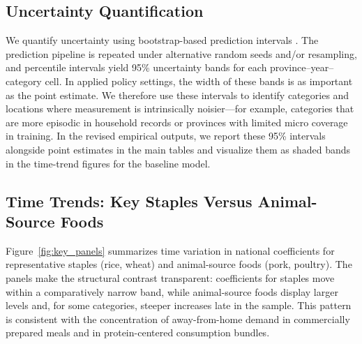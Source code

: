 \documentclass[12pt,a4paper]{article}
\begin{document}
\subsection{Uncertainty Quantification}

We quantify uncertainty using bootstrap-based prediction intervals \citep{Efron1993}. The prediction pipeline is repeated under alternative random seeds and/or resampling, and percentile intervals yield 95\% uncertainty bands for each province--year--category cell. In applied policy settings, the width of these bands is as important as the point estimate. We therefore use these intervals to identify categories and locations where measurement is intrinsically noisier---for example, categories that are more episodic in household records or provinces with limited micro coverage in training. In the revised empirical outputs, we report these 95\% intervals alongside point estimates in the main tables and visualize them as shaded bands in the time-trend figures for the baseline model.

\subsection{Time Trends: Key Staples Versus Animal-Source Foods}

Figure~\ref{fig:key_panels} summarizes time variation in national coefficients for representative staples (rice, wheat) and animal-source foods (pork, poultry). The panels make the structural contrast transparent: coefficients for staples move within a comparatively narrow band, while animal-source foods display larger levels and, for some categories, steeper increases late in the sample. This pattern is consistent with the concentration of away-from-home demand in commercially prepared meals and in protein-centered consumption bundles.
\end{document}
